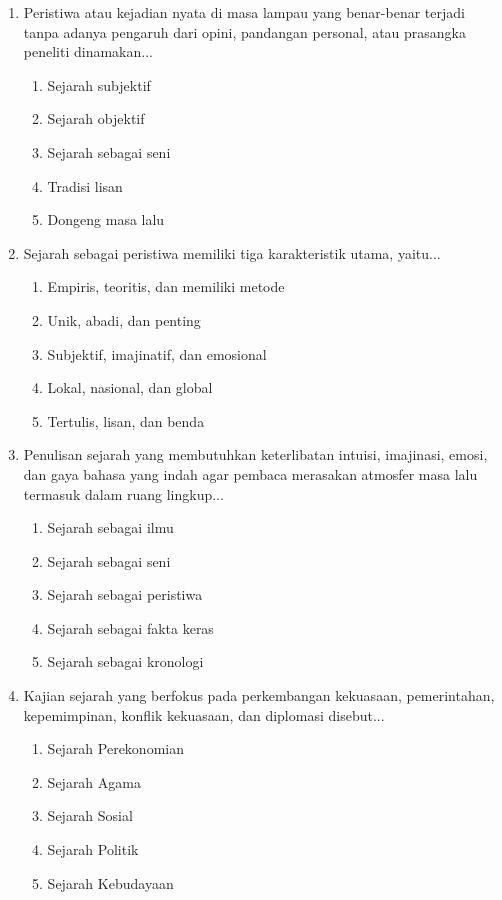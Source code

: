 \documentclass[12pt, a4paper]{article}
\begin{document}
\begin{enumerate}[label=\arabic*.]
    \item Peristiwa atau kejadian nyata di masa lampau yang benar-benar terjadi tanpa adanya pengaruh dari opini, pandangan personal, atau prasangka peneliti dinamakan...
    \begin{enumerate}[label=\Alph*.]
        \item Sejarah subjektif
        \item Sejarah objektif
        \item Sejarah sebagai seni
        \item Tradisi lisan
        \item Dongeng masa lalu
    \end{enumerate}

    \item Sejarah sebagai peristiwa memiliki tiga karakteristik utama, yaitu...
    \begin{enumerate}[label=\Alph*.]
        \item Empiris, teoritis, dan memiliki metode
        \item Unik, abadi, dan penting
        \item Subjektif, imajinatif, dan emosional
        \item Lokal, nasional, dan global
        \item Tertulis, lisan, dan benda
    \end{enumerate}

    \item Penulisan sejarah yang membutuhkan keterlibatan intuisi, imajinasi, emosi, dan gaya bahasa yang indah agar pembaca merasakan atmosfer masa lalu termasuk dalam ruang lingkup...
    \begin{enumerate}[label=\Alph*.]
        \item Sejarah sebagai ilmu
        \item Sejarah sebagai seni
        \item Sejarah sebagai peristiwa
        \item Sejarah sebagai fakta keras
        \item Sejarah sebagai kronologi
    \end{enumerate}

    \item Kajian sejarah yang berfokus pada perkembangan kekuasaan, pemerintahan, kepemimpinan, konflik kekuasaan, dan diplomasi disebut...
    \begin{enumerate}[label=\Alph*.]
        \item Sejarah Perekonomian
        \item Sejarah Agama
        \item Sejarah Sosial
        \item Sejarah Politik
        \item Sejarah Kebudayaan
    \end{enumerate}


\end{enumerate}
\end{document}
